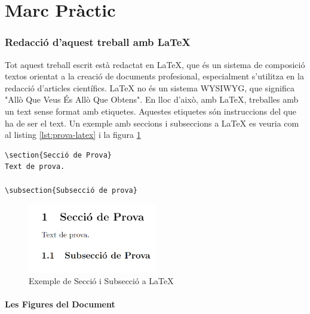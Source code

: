 \part*{Marc Pràctic}

\section{Redacció d'aquest treball amb \LaTeX}

Tot aquest treball escrit està redactat en LaTeX, que és un sistema de composició textos orientat a la creació de documents profesional, especialment s'utilitza en la redacció d'articles científics.
LaTeX no és un sistema WYSIWYG, que significa "Allò Que Veus És Allò Que Obtens". En lloc d'això, amb LaTeX, treballes amb un text sense format amb etiquetes. Aquestes etiquetes són instruccions del que ha de ser el text.
Un exemple amb seccions i subseccions a LaTeX es veuria com al listing \ref{lst:prova-latex} i la figura \ref{fig:prova-latex}

\begin{lstlisting}[style=latex, caption={Exemple de Secció i Subsecció a LaTeX}, label={lst:prova-latex}]
\section{Secció de Prova}
Text de prova.

\subsection{Subsecció de prova}

\end{lstlisting}

\begin{figure}[h]
    \centering
    \includegraphics[width=0.5\textwidth]{img/figures/prova-codi-latex.png}
    \caption{Exemple de Secció i Subsecció a LaTeX}
    \label{fig:prova-latex}
\end{figure}

\subsection{Les Figures del Document}

